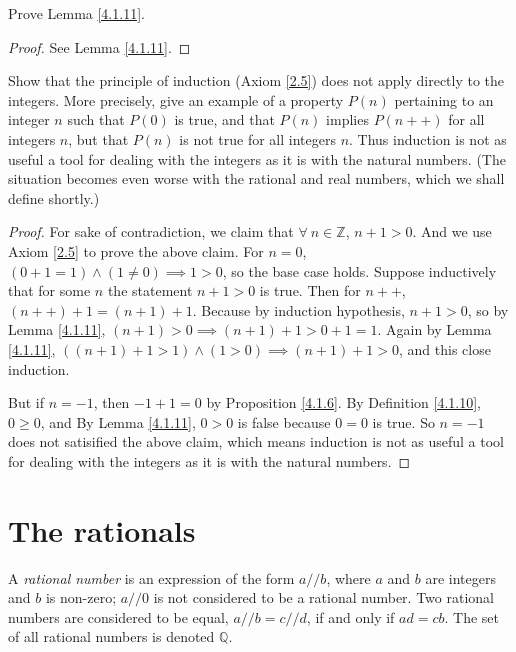 \begin{exercise}\label{ex 4.1.7}
Prove Lemma \ref{4.1.11}.
\end{exercise}

\begin{proof}
See Lemma \ref{4.1.11}.
\end{proof}

\begin{exercise}\label{ex 4.1.8}
Show that the principle of induction (Axiom \ref{2.5}) does not apply directly to the integers.
More precisely, give an example of a property \(P(n)\) pertaining to an integer \(n\) such that \(P(0)\) is true, and that \(P(n)\) implies \(P(n++)\) for all integers \(n\), but that \(P(n)\) is not true for all integers \(n\).
Thus induction is not as useful a tool for dealing with the integers as it is with the natural numbers.
(The situation becomes even worse with the rational and real numbers, which we shall define shortly.)
\end{exercise}

\begin{proof}
For sake of contradiction, we claim that \(\forall\ n \in \mathds{Z}\), \(n + 1 > 0\).
And we use Axiom \ref{2.5} to prove the above claim.
For \(n = 0\), \((0 + 1 = 1) \land (1 \neq 0) \implies 1 > 0\), so the base case holds.
Suppose inductively that for some \(n\) the statement \(n + 1 > 0\) is true.
Then for \(n++\), \((n++) + 1 = (n + 1) + 1\).
Because by induction hypothesis, \(n + 1 > 0\), so by Lemma \ref{4.1.11}, \((n + 1) > 0 \implies (n + 1) + 1 > 0 + 1 = 1\).
Again by Lemma \ref{4.1.11}, \(((n + 1) + 1 > 1) \land (1 > 0) \implies (n + 1) + 1 > 0\), and this close induction.

But if \(n = -1\), then \(-1 + 1 = 0\) by Proposition \ref{4.1.6}.
By Definition \ref{4.1.10}, \(0 \geq 0\), and By Lemma \ref{4.1.11}, \(0 > 0\) is false because \(0 = 0\) is true.
So \(n = -1\) does not satisified the above claim, which means induction is not as useful a tool for dealing with the integers as it is with the natural numbers.
\end{proof}

\section{The rationals}

\begin{definition}\label{4.2.1}
A \emph{rational number} is an expression of the form \(a // b\), where \(a\) and \(b\) are integers and \(b\) is non-zero;
\(a // 0\) is not considered to be a rational number.
Two rational numbers are considered to be equal, \(a // b = c // d\), if and only if \(ad = cb\).
The set of all rational numbers is denoted \(\mathds{Q}\).
\end{definition}

